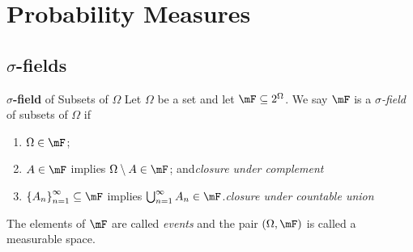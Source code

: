 \documentclass[stat901]{subfiles}
\begin{document}
    \section{Probability Measures}

    \subsection{$\sigma$-fields}

    \begin{definition}{\textbf{$\sigma$-field} of Subsets of $\Omega$}
        Let $\Omega$ be a set and let $\mF\subseteq 2^{\Omega}$. We say $\mF$ is a \emph{$\sigma$-field} of subsets of $\Omega$ if
        \begin{enumerate}
            \item $\Omega\in\mF$;
            \item $A\in\mF$ implies $\Omega\setminus A\in\mF$; and\hfill\textit{closure under complement}
            \item $\left\lbrace A_n \right\rbrace^{\infty}_{n=1}\subseteq\mF$ implies $\bigcup^{\infty}_{n=1}A_n\in\mF$.\hfill\textit{closure under countable union}
        \end{enumerate}
        The elements of $\mF$ are called \emph{events} and the pair $\left( \Omega,\mF \right)$ is called a measurable space.
    \end{definition}
\end{document}
